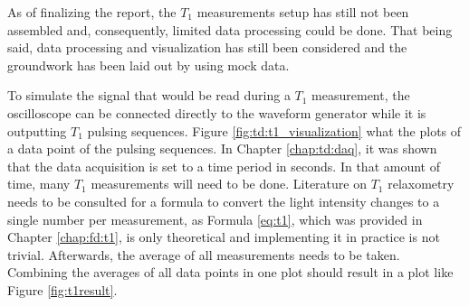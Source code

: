 As of finalizing the report, the $T_1$ measurements setup has still not been assembled and, consequently, limited data processing could be done. That being said, data processing and visualization has still been considered and the groundwork has been laid out by using mock data.

To simulate the signal that would be read during a $T_1$ measurement, the oscilloscope can be connected directly to the waveform generator while it is outputting $T_1$ pulsing sequences. Figure \ref{fig:td:t1_visualization} what the plots of a data point of the pulsing sequences. In Chapter \ref{chap:td:daq}, it was shown that the data acquisition is set to a time period in seconds. In that amount of time, many $T_1$ measurements will need to be done. Literature on $T_1$ relaxometry needs to be consulted for a formula to convert the light intensity changes to a single number per measurement, as Formula \eqref{eq:t1}, which was provided in Chapter \ref{chap:fd:t1}, is only theoretical and implementing it in practice is not trivial. Afterwards, the average of all measurements needs to be taken. Combining the averages of all data points in one plot should result in a plot like Figure \ref{fig:t1result}. 